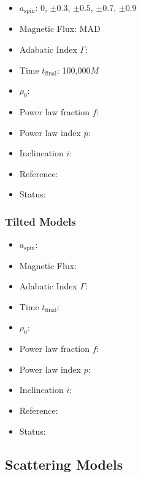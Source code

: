 \documentclass[twocolumn,twocolappendix,tighten,dvipsnames,linenumbers]{aastex63}
\begin{document}
\begin{itemize}
\item $a_\mathrm{spin}$: 0, $\pm0.3$, $\pm0.5$, $\pm0.7$, $\pm0.9$
\item Magnetic Flux: MAD
\item Adabatic Index $\Gamma$:
\item Time $t_\mathrm{final}$: 100,000$M$
\item $\rho_0$:
\item Power law fraction $f$:
\item Power law index $p$:
\item Inclincation $i$:
\item Reference:
\item Status:
\end{itemize}

\subsubsection{Tilted Models}

\begin{itemize}
\item $a_\mathrm{spin}$:
\item Magnetic Flux:
\item Adabatic Index $\Gamma$:
\item Time $t_\mathrm{final}$:
\item $\rho_0$:
\item Power law fraction $f$:
\item Power law index $p$:
\item Inclincation $i$:
\item Reference:
\item Status:
\end{itemize}

\subsection{Scattering Models}
\end{document}
